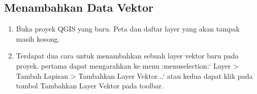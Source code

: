 \subsection{Menambahkan Data Vektor}
\begin{enumerate}
\item 
Buka proyek QGIS yang baru. Peta dan daftar layer yang akan tampak masih kosong.
\item
Terdapat dua cara untuk menambahkan sebuah layer vektor baru pada proyek. pertama dapat mengarahkan ke menu :menuselection:` Layer > Tambah Lapisan > Tambahkan Layer Vektor...` atau kedua dapat klik pada tombol Tambahkan Layer Vektor pada toolbar.

\end{enumerate}

